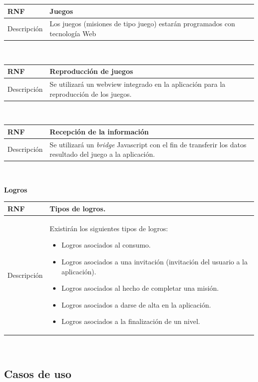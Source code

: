 \documentclass[twoside]{report}
\newcommand\addrow[2]{#1 &#2\\ }
\newcommand\addheading[2]{#1 &#2\\ \hline}
\newcommand\tabularhead{\begin{tabular}{lp{0.7\textwidth}}
\hline
}
\newenvironment{req}{\tabularhead}
{\hline\end{tabular}}
\begin{document}
\begin{req}
	\addheading{\textbf{RNF\arabic{nonFunctionalRequirements}}}{Juegos}
	\addrow{Descripción}{Los juegos (misiones de tipo juego) estarán programados con tecnología Web}
\end{req}\\

\begin{req}
	\addheading{\textbf{RNF\arabic{nonFunctionalRequirements}}}{Reproducción de juegos}
	\addrow{Descripción}{Se utilizará un webview integrado en la aplicación para la reproducción de los juegos.}
\end{req}\\

\begin{req}
	\addheading{\textbf{RNF\arabic{nonFunctionalRequirements}}}{Recepción de la información}
	\addrow{Descripción}{Se utilizará un \textit{bridge} Javascript con el fin de transferir los datos resultado del juego a la aplicación.}
\end{req}\\

\textbf{Logros}\\

\begin{req}
	\addheading{\textbf{RNF\arabic{nonFunctionalRequirements}}}{Tipos de logros.}
	\addrow{Descripción}{Existirán los siguientes tipos de logros:
	\begin{itemize}
	\item Logros asociados al consumo.
	\item Logros asociados a una invitación (invitación del usuario a la aplicación).
	\item Logros asociados al hecho de completar una misión.
	\item Logros asociados a darse de alta en la aplicación.
	\item Logros asociados a la finalización de un nivel.
	\end{itemize}}
\end{req}\\

\subsection{Casos de uso}
\end{document}
